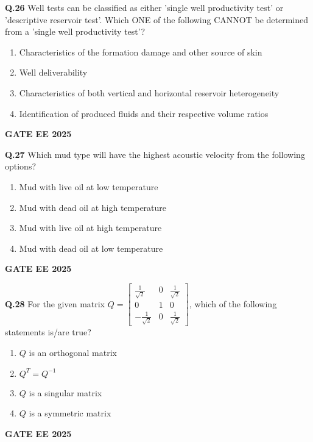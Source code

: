 \documentclass{article}
\begin{document}
\vspace{0.5cm}

\textbf{Q.26} Well tests can be classified as either 'single well productivity test' or 'descriptive reservoir test'. Which ONE of the following CANNOT be determined from a 'single well productivity test'?
\begin{enumerate}[label=(\Alph*)]
    \item Characteristics of the formation damage and other source of skin
    \item Well deliverability
    \item Characteristics of both vertical and horizontal reservoir heterogeneity
    \item Identification of produced fluids and their respective volume ratios
\end{enumerate}
\textbf{GATE EE 2025}

\vspace{0.5cm}

\textbf{Q.27} Which mud type will have the highest acoustic velocity from the following options?
\begin{enumerate}[label=(\Alph*)]
    \item Mud with live oil at low temperature
    \item Mud with dead oil at high temperature
    \item Mud with live oil at high temperature
    \item Mud with dead oil at low temperature
\end{enumerate}
\textbf{GATE EE 2025}

\vspace{0.5cm}

\textbf{Q.28} For the given matrix $Q = \begin{bmatrix} 
\frac{1}{\sqrt{2}} & 0 & \frac{1}{\sqrt{2}} \\ 
0 & 1 & 0 \\ 
-\frac{1}{\sqrt{2}} & 0 & \frac{1}{\sqrt{2}} 
\end{bmatrix}$, which of the following statements is/are true?
\begin{enumerate}[label=(\Alph*)]
    \item $Q$ is an orthogonal matrix
    \item $Q^T = Q^{-1}$
    \item $Q$ is a singular matrix
    \item $Q$ is a symmetric matrix
\end{enumerate}
\textbf{GATE EE 2025}
\end{document}
